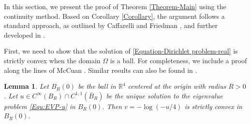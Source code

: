 \documentclass[11pt]{amsart}
\newtheorem{lemma}[theorem]{Lemma}
\numberwithin{theorem}{section}
\numberwithin{equation}{section}
\begin{document}
In this section, we present the proof of Theorem \ref{Theorem-Main} using the continuity method. Based on Corollary \ref{Corollary}, the argument follows a standard approach, as outlined by Caffarelli and Friedman \cite{Caffarelli-Friedman1985}, and further developed in \cite{Korevaar-Lewis1987, Liu-Ma-Xu2010, Ma-Xu2008, Zhang-Zhou2023, Zhang-Zhou2025}.

First, we need to show that the solution of \eqref{Equation-Dirichlet problem-real} is strictly convex when the domain $\Omega$ is a ball. For completeness, we include a proof along the lines of McCuan \cite{McCuan2002}. Similar results can also be found in \cite{Huang2019, Liu-Ma-Xu2010}.
\begin{lemma}\label{Lemma-ball}
Let $B_R(0)$ be the ball in $\mathbb{R}^4$ centered at the origin with radius $R>0$. Let $u\in C^\infty(B_R)\cap C^{1, 1}(\bar{B}_R)$ be the unique solution to the eigenvalue problem \eqref{Equ:EVP-u} in $B_R(0)$. Then $v=-\log(-u/4)$ is strictly convex in $B_R(0)$.
\end{lemma}
\end{document}
